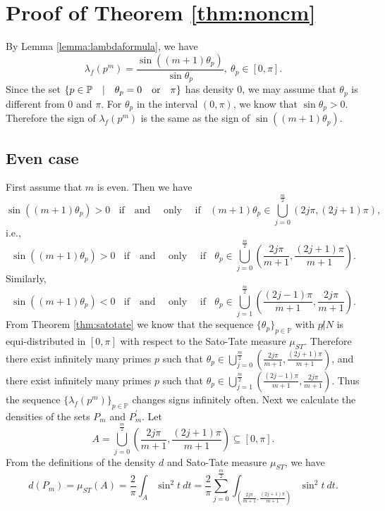 \documentclass[12pt,a4paper,reqno]{amsart}
\begin{document}
\section{Proof of Theorem \ref{thm:noncm}}
By Lemma \ref{lemma:lambdaformula}, we have
$$\lambda_f(p^m)= \frac{\sin{((m+1)\theta_p)}}{\sin{\theta_p}}, \ \theta_p \in [0,\pi].$$
Since the set $\{p\in \mathbb{P} ~~~|~~~ \theta_p=0 ~~~{\rm or}~~~\pi\}$ has density $0$,
we may assume that $\theta_p$ is different from $0$ and $\pi$. 
For $\theta_p$ in the interval $(0,\pi)$, we know that $\sin{\theta_p} > 0$. Therefore the sign of 
$\lambda_f(p^m)$ is the same as the sign of $\sin{((m+1) \theta_p)}$.
\subsection{Even case}
First assume that $m$ is even. Then we have 
$$
\sin{((m+1) \theta_p)} >0~~~~\mbox{if~~~and~~~~only~~~~if}~~~~
(m+1)\theta_p\in \bigcup_{j=0}^{\frac{m}{2}}(2j\pi , (2j+1)\pi),
$$
i.e., 
\begin{equation}\label{eq:1}
\sin{((m+1) \theta_p)} >0~~~~\mbox{if~~~and~~~~only~~~~if}~~~~
\theta_p\in \bigcup_{j=0}^{\frac{m}{2}}\left(\frac{2j\pi}{m+1}, \frac{(2j+1)\pi}{m+1}\right).
\end{equation}
Similarly,
\begin{equation}\label{eq:2}
\sin{((m+1) \theta_p)} <0~~~~\mbox{if~~~and~~~~only~~~~if}~~~~
\theta_p\in \bigcup_{j=1}^{\frac{m}{2}}\left(\frac{(2j-1)\pi}{m+1}, \frac{2j\pi}{m+1}\right).
\end{equation}
From Theorem \ref{thm:satotate} we know that the sequence $\{\theta_p\}_{p\in \mathbb{P}}$ with
$p\not|N$ is 
equi-distributed in $[0,\pi]$ with respect to the Sato-Tate measure $\mu_{ST}$.
Therefore there exist infinitely many primes $p$ such that 
$\theta_p\in \bigcup_{j=0}^{\frac{m}{2}}\left(\frac{2j\pi}{m+1}, \frac{(2j+1)\pi}{m+1}\right)$, and there exist infinitely many primes $p$ such that 
$\theta_p\in \bigcup_{j=1}^{\frac{m}{2}}\left(\frac{(2j-1)\pi}{m+1}, \frac{2j\pi}{m+1}\right)$.
Thus the sequence $\{\lambda_f(p^m)\}_{p\in \mathbb{P}}$ changes signs infinitely often. 
Next we calculate the densities of the sets $P_m$ and $P^{'}_m$.
Let
$$
A=\bigcup_{j=0}^{\frac{m}{2}}\left(\frac{2j\pi}{m+1}, \frac{(2j+1)\pi}{m+1}\right)
 \subseteq [0,\pi].
$$
From the definitions of the density $d$ and Sato-Tate measure $\mu_{ST}$, we have
$$
d(P_m)= \mu_{ST}(A)= \frac{2}{\pi}\int_{A}\sin^2t \ dt= 
\frac{2}{\pi}\sum_{j=0}^{\frac{m}{2}}\int_{\left(\frac{2j\pi}{m+1},\frac{(2j+1)\pi}{
m+1}\right)}\sin^2t \ dt.
$$
\end{document}
